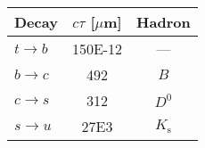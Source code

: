 \begin{tabular}{l S[table-format=3.0e1] c} %
  Decay & $c\tau$ [$\mu$m] & Hadron \\ \hline
  $t \to b$ & 150E-12 & --- \\
  $b \to c$ & 492  & $B$ \\
  $c \to s$ & 312  & $D^0$ \\
  $s \to u$ & 27E3  & $K_{\mathrm{s}}$
\end{tabular}

